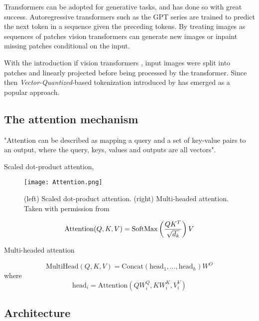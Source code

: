 \documentclass[../../thesis.tex]{subfiles}
\begin{document}
Transformers can be adopted for generative tasks, and has done so with great success. Autoregressive transformers such as the GPT series are trained to predict the next token in a sequence given the preceding tokens. By treating images as sequences of patches vision transformers can generate new images or inpaint missing patches conditional on the input.\newline

With the introduction if vision transformers \cite{dosovitskiy2021image}, input images were split into patches and linearly projected before being processed by the transformer. Since then \textit{Vector-Quantized}-based tokenization introduced by \cite{VQVAE} has emerged as a popular approach.




\subsection{The attention mechanism}
"Attention can be described as mapping a query and a set of key-value pairs to an output, where the query, keys, values and outputs are all vectors". 


Scaled dot-product attention, 

\begin{figure}[h]
    \texttt{[image: Attention.png]}
    \centering 
    \label{fig:attention}
    \caption{(left) Scaled dot-product attention. (right) Multi-headed attention. Taken with permission from \cite{vaswani2023attention}}
\end{figure}


\begin{equation}
    \text{Attention}(Q,K,V) = \operatorname{SoftMax} \left(\frac{QK^T}{\sqrt{d_k}}\right)V
\end{equation}

Multi-headed attention

\begin{equation}
    \text{MultiHead}(Q,K,V) = \text{Concat}(\text{head}_1,\dots, \text{head}_h)W^O
\end{equation}
where
\begin{equation}
    \text{head}_i = \text{Attention}(QW_i^Q,KW_i^K,V_i^V)
\end{equation}
\subsection{Architecture}
\end{document}

